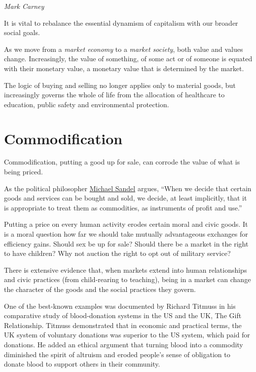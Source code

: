 \documentclass[
]{book}
\begin{document}
\emph{Mark Carney}

It is vital to rebalance the essential dynamism of capitalism
with our broader social goals.

As we move from a \emph{market economy} to a \emph{market society},
both value and values change.
Increasingly, the value of something, of some act or of someone
is equated with their monetary value,
a monetary value that is determined by the market.

The logic of buying and selling no longer applies only to material goods, but increasingly governs the whole of life from the allocation of healthcare to education, public safety and environmental protection.

\hypertarget{commodification}{%
\section{Commodification}\label{commodification}}

Commodification, putting a good up for sale,
can corrode the value of what is being priced.

As the political philosopher
\href{https://www.theguardian.com/books/2020/sep/06/michael-sandel-the-populist-backlash-has-been-a-revolt-against-the-tyranny-of-merit}{Michael Sandel}
argues, ``When we decide that certain goods and services can be bought and sold, we decide, at least implicitly, that it is appropriate to treat them as commodities, as instruments of profit and use.''

Putting a price on every human activity erodes certain moral and civic goods. It is a moral question how far we should take mutually advantageous exchanges for efficiency gains. Should sex be up for sale? Should there be a market in the right to have children? Why not auction the right to opt out of military service?

There is extensive evidence that, when markets extend into human relationships and civic practices (from child-rearing to teaching), being in a market can change the character of the goods and the social practices they govern.

One of the best-known examples was documented by Richard Titmuss in his comparative study of blood-donation systems in the US and the UK, The Gift Relationship. Titmuss demonstrated that in economic and practical terms, the UK system of voluntary donations was superior to the US system, which paid for donations. He added an ethical argument that turning blood into a commodity diminished the spirit of altruism and eroded people's sense of obligation to donate blood to support others in their community.
\end{document}
